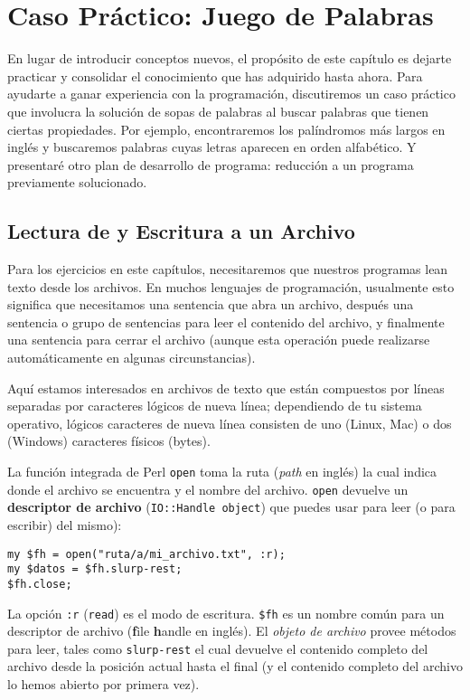 
\chapter{Caso Práctico: Juego de Palabras}
\label{wordplay}

En lugar de introducir conceptos nuevos, el propósito de 
este capítulo es dejarte practicar y consolidar el conocimiento
que has adquirido hasta ahora. Para ayudarte a ganar experiencia
con la programación, discutiremos un caso práctico que involucra
la solución de sopas de palabras al buscar palabras que tienen
ciertas propiedades. Por ejemplo, encontraremos los palíndromos
más largos en inglés y buscaremos palabras cuyas letras aparecen
en orden alfabético. Y presentaré otro plan de desarrollo de programa:
reducción a un programa previamente solucionado.

\section{Lectura de y Escritura a un Archivo}

Para los ejercicios en este capítulos, necesitaremos que nuestros
programas lean texto desde los archivos. En muchos lenguajes 
de programación, usualmente esto significa que necesitamos una sentencia
que abra un archivo, después una sentencia o grupo de sentencias 
para leer el contenido del archivo, y finalmente una sentencia para
cerrar el archivo (aunque esta operación puede realizarse automáticamente
en algunas circunstancias).

Aquí estamos interesados en archivos de texto que están compuestos 
por líneas separadas por caracteres lógicos de nueva línea; 
dependiendo de tu sistema operativo, lógicos caracteres de nueva línea
consisten de uno (Linux, Mac) o dos (Windows) caracteres físicos (bytes).

La función integrada de Perl {\tt open} toma la ruta (\emph{path} en inglés) la cual indica donde el 
archivo se encuentra y el nombre del archivo. {\tt open} devuelve
un {\bf descriptor de archivo} ({\tt IO::Handle object}) que puedes usar
para leer (o para escribir) del mismo):

\begin{verbatim}
my $fh = open("ruta/a/mi_archivo.txt", :r);
my $datos = $fh.slurp-rest;
$fh.close;
\end{verbatim}
%
La opción {\tt :r}  ({\tt read}) es el modo de escritura. {\tt \$fh} es
un nombre común para un descriptor de archivo ({\bf f}ile {\bf h}andle en inglés).
El \emph{objeto de archivo} provee métodos para leer, tales como {\tt slurp-rest}
el cual devuelve el contenido completo del archivo desde la posición actual hasta
el final (y el contenido completo del archivo lo hemos abierto por primera vez).

